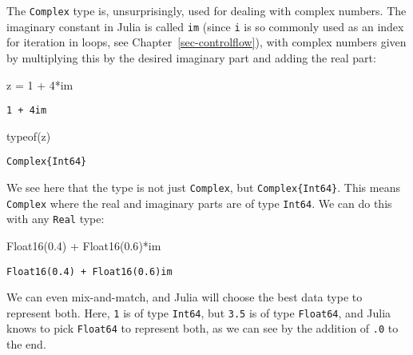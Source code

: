 \documentclass[
  letterpaper,
  DIV=11,
  numbers=noendperiod]{scrreprt}
\newenvironment{Shaded}{\begin{snugshade}}{\end{snugshade}}
\newcommand{\ConstantTok}[1]{\textcolor[rgb]{0.56,0.35,0.01}{#1}}
\newcommand{\FloatTok}[1]{\textcolor[rgb]{0.68,0.00,0.00}{#1}}
\newcommand{\FunctionTok}[1]{\textcolor[rgb]{0.28,0.35,0.67}{#1}}
\newcommand{\NormalTok}[1]{\textcolor[rgb]{0.00,0.23,0.31}{#1}}
\newcommand{\OperatorTok}[1]{\textcolor[rgb]{0.37,0.37,0.37}{#1}}
\begin{document}
The \texttt{Complex} type is, unsurprisingly, used for dealing with
complex numbers. The imaginary constant in Julia is called \texttt{im}
(since \texttt{i} is so commonly used as an index for iteration in
loops, see Chapter~\ref{sec-controlflow}), with complex numbers given by
multiplying this by the desired imaginary part and adding the real part:

\begin{Shaded}
\begin{Highlighting}[]
\NormalTok{z }\OperatorTok{=} \FloatTok{1} \OperatorTok{+} \FloatTok{4}\OperatorTok{*}\ConstantTok{im}
\end{Highlighting}
\end{Shaded}

\begin{verbatim}
1 + 4im
\end{verbatim}

\begin{Shaded}
\begin{Highlighting}[]
\FunctionTok{typeof}\NormalTok{(z)}
\end{Highlighting}
\end{Shaded}

\begin{verbatim}
Complex{Int64}
\end{verbatim}

We see here that the type is not just \texttt{Complex}, but
\texttt{Complex\{Int64\}}. This means \texttt{Complex} where the real
and imaginary parts are of type \texttt{Int64}. We can do this with any
\texttt{Real} type:

\begin{Shaded}
\begin{Highlighting}[]
\FunctionTok{Float16}\NormalTok{(}\FloatTok{0.4}\NormalTok{) }\OperatorTok{+} \FunctionTok{Float16}\NormalTok{(}\FloatTok{0.6}\NormalTok{)}\OperatorTok{*}\ConstantTok{im}
\end{Highlighting}
\end{Shaded}

\begin{verbatim}
Float16(0.4) + Float16(0.6)im
\end{verbatim}

We can even mix-and-match, and Julia will choose the best data type to
represent both. Here, \texttt{1} is of type \texttt{Int64}, but
\texttt{3.5} is of type \texttt{Float64}, and Julia knows to pick
\texttt{Float64} to represent both, as we can see by the addition of
\texttt{.0} to the end.
\end{document}
